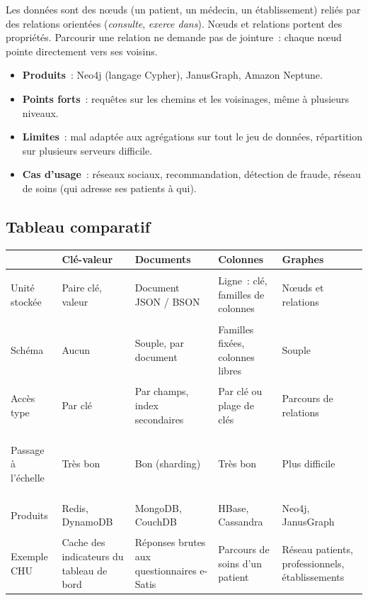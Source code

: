 \noindent Les données sont des n\oe uds (un patient, un médecin, un établissement) reliés par des relations orientées (\textit{consulte}, \textit{exerce dans}). N\oe uds et relations portent des propriétés. Parcourir une relation ne demande pas de jointure~: chaque n\oe ud pointe directement vers ses voisins.
\begin{itemize}
	\item \textbf{Produits}~: Neo4j (langage Cypher), JanusGraph, Amazon Neptune.
	\item \textbf{Points forts}~: requêtes sur les chemins et les voisinages, même à plusieurs niveaux.
	\item \textbf{Limites}~: mal adaptée aux agrégations sur tout le jeu de données, répartition sur plusieurs serveurs difficile.
	\item \textbf{Cas d'usage}~: réseaux sociaux, recommandation, détection de fraude, réseau de soins (qui adresse ses patients à qui).
\end{itemize}

\subsection{Tableau comparatif}

\begin{center}
\small
\begin{tabularx}{\textwidth}{>{\bfseries\raggedright\arraybackslash}p{2.3cm} >{\raggedright\arraybackslash}X >{\raggedright\arraybackslash}X >{\raggedright\arraybackslash}X >{\raggedright\arraybackslash}X}
\toprule
 & Clé-valeur & Documents & Colonnes & Graphes \\
\midrule
Unité stockée & Paire clé, valeur & Document JSON / BSON & Ligne~: clé, familles de colonnes & N\oe uds et relations \\
Schéma & Aucun & Souple, par document & Familles fixées, colonnes libres & Souple \\
Accès type & Par clé & Par champs, index secondaires & Par clé ou plage de clés & Parcours de relations \\
Passage à l'échelle & Très bon & Bon (sharding) & Très bon & Plus difficile \\
Produits & Redis, DynamoDB & MongoDB, CouchDB & HBase, Cassandra & Neo4j, JanusGraph \\
Exemple CHU & Cache des indicateurs du tableau de bord & Réponses brutes aux questionnaires e-Satis & Parcours de soins d'un patient & Réseau patients, professionnels, établissements \\
\bottomrule
\end{tabularx}
\end{center}

